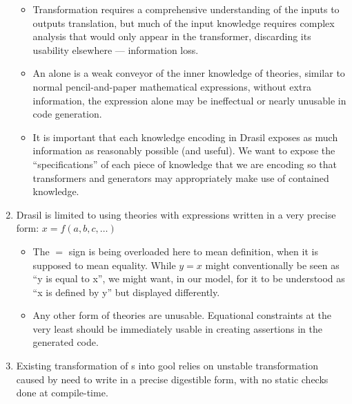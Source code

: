 \begin{enumerate}
\begin{itemize}
		      \item Transformation requires a comprehensive understanding of the inputs to
		            outputs translation, but much of the input knowledge requires complex
		            analysis that would only appear in the transformer, discarding its
		            usability elsewhere — information loss.

		      \item An \Expr{} alone is a weak conveyor of the inner knowledge
		            of theories, similar to normal pencil-and-paper mathematical
		            expressions, without extra information, the expression alone
		            may be ineffectual or nearly unusable in code generation.

		      \item It is important that each knowledge encoding in Drasil exposes as much
		            information as reasonably possible (and useful). We want to expose the
		            ``specifications'' of each piece of knowledge that we are encoding so
		            that transformers and generators may appropriately make use of
		            contained knowledge.

	      \end{itemize}

	\item Drasil is limited to using theories with expressions written in a very
	      precise form: \(x = f(a, b, c, \ldots{})\) 

	      \begin{itemize}

		      \item The \(=\) sign is being overloaded here to mean definition,
		            when it is supposed to mean equality. While \(y = x\) might
		            conventionally be seen as ``y is equal to x'', we might
		            want, in our model, for it to be understood as ``x is
		            defined by y'' but displayed differently.

		      \item Any other form of theories are unusable. Equational
		            constraints at the very least should be immediately usable
		            in creating assertions in the generated code.

	      \end{itemize}

	\item Existing transformation of \RelationConcept{}s into \acs{gool} relies
	      on unstable transformation caused by need to write in a precise digestible
	      form, with no static checks done at compile-time.

\end{enumerate}

